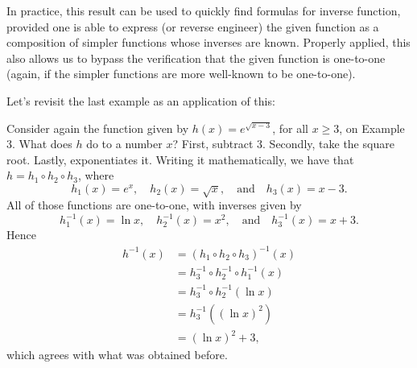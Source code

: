 \documentclass[nooutcomes]{ximera}
\begin{document}
In practice, this result can be used to quickly find formulas for inverse function, provided one is able to express (or reverse engineer) the given function as a composition of simpler functions whose inverses are known. Properly applied, this also allows us to bypass the verification that the given function is one-to-one (again, if the simpler functions are more well-known to be one-to-one). 

Let's revisit the last example as an application of this:

\begin{example}
  Consider again the function given by $h(x) = e^{\sqrt{x-3}}$, for all $x\geq 3$, on Example 3. What does $h$ do to a number $x$? First, subtract $3$. Secondly, take the square root. Lastly, exponentiates it. Writing it mathematically, we have that $h = h_1\circ h_2\circ h_3$, where $$h_1(x) =e^x,\quad h_2(x) = \sqrt{x},\quad\mbox{and}\quad h_3(x)= x-3.$$All of those functions are one-to-one, with inverses given by $$h_1^{-1}(x) = \ln x,\quad h_2^{-1}(x) = x^2,\quad\mbox{and}\quad h_3^{-1}(x) = x+3.$$Hence \begin{align*}h^{-1}(x) &= (h_1\circ h_2\circ h_3)^{-1}(x) \\ &= h_3^{-1}\circ h_2^{-1} \circ h_1^{-1}(x) \\ &= h_3^{-1}\circ h_2^{-1}(\ln x) \\ &= h_3^{-1}((\ln x)^2) \\ &= (\ln x)^2 + 3, \end{align*}which agrees with what was obtained before.
\end{example}
\end{document}

